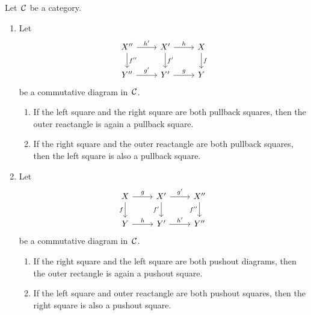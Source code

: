 \begin{lemma*}
  \label{transitivity of pullback and pushout}
  Let~$\mathcal{C}$ be a category.
  \begin{enumerate}
    \item
      Let
      \[
        \begin{tikzcd}
            X''
            \arrow{r}[above]{h'}
            \arrow{d}[right]{f''}
          & X'
            \arrow{r}[above]{h}
            \arrow{d}[right]{f'}
          & X
            \arrow{d}[right]{f}
          \\
            Y''
            \arrow{r}[above]{g'}
          & Y'
            \arrow{r}[above]{g}
          & Y
        \end{tikzcd}
      \]
      be a commutative diagram in~$\mathcal{C}$.
      \begin{enumerate}
        \item
          If the left square and the right square are both pullback squares, then the outer reactangle is again a pullback square.
        \item
          If the right square and the outer reactangle are both pullback squares, then the left square is also a pullback square.
      \end{enumerate}
    \item
      \label{pasting pushouts}
      Let
      \[
        \begin{tikzcd}
            X
            \arrow{r}[above]{g}
            \arrow{d}[left]{f}
          & X'
            \arrow{r}[above]{g'}
            \arrow{d}[left]{f'}
          & X''
            \arrow{d}[left]{f''}
          \\
            Y
            \arrow{r}[above]{h}
          & Y'
            \arrow{r}[above]{h'}
          & Y''
        \end{tikzcd}
      \]
      be a commutative diagram in~$\mathcal{C}$.
      \begin{enumerate}
        \item
          If the right square and the left square are both pushout diagrams, then the outer rectangle is again a pushout square.
        \item
          If the left square and outer reactangle are both pushout squares, then the right square is also a pushout square.
      \end{enumerate}
  \end{enumerate}
\end{lemma*}


